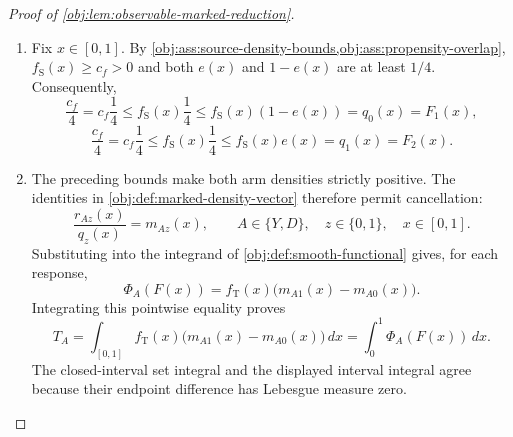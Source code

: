 \begin{proof}[Proof of \cref{obj:lem:observable-marked-reduction}]
\begin{enumerate}
For either response \(A\in\{Y,D\}\), restriction by the same indicator and the source arm-moment identity in \cref{obj:ass:arm-means-holder} give
\[
\begin{aligned}
\int_{\{X\in B\}}\mathbf 1_{\{Z=z\}}A\,dP_{\mathrm S}
&=\int_{\{X\in B,\;Z=z\}}A\,dP_{\mathrm S}\\
&=\int_B f_{\mathrm S}(x)\pi_z(x)m_{Az}(x)\,dx
=\int_B r_{Az}(x)\,dx.
\end{aligned}
\]
Applying this identity first to \(Y\) in arms \(0,1\), and then to \(D\) in arms \(0,1\), yields respectively
\[
\begin{aligned}
\int_B F_3(x)\,dx&=\int_{\{X\in B\}}(1-Z)Y\,dP_{\mathrm S},&
\int_B F_4(x)\,dx&=\int_{\{X\in B\}}ZY\,dP_{\mathrm S},\\
\int_B F_5(x)\,dx&=\int_{\{X\in B\}}(1-Z)D\,dP_{\mathrm S},&
\int_B F_6(x)\,dx&=\int_{\{X\in B\}}ZD\,dP_{\mathrm S}.
\end{aligned}
\]
These arguments apply also when \(B\) is empty.

\item Fix \(x\in[0,1]\). By
\cref{obj:ass:source-density-bounds,obj:ass:propensity-overlap},
\(f_{\mathrm S}(x)\ge c_f>0\) and both \(e(x)\) and \(1-e(x)\) are at least \(1/4\). Consequently,
\[
\frac{c_f}{4}
=c_f\frac14
\le f_{\mathrm S}(x)\frac14
\le f_{\mathrm S}(x)(1-e(x))
=q_0(x)=F_1(x),
\]
\[
\frac{c_f}{4}
=c_f\frac14
\le f_{\mathrm S}(x)\frac14
\le f_{\mathrm S}(x)e(x)
=q_1(x)=F_2(x).
\]

\item The preceding bounds make both arm densities strictly positive. The identities in \cref{obj:def:marked-density-vector} therefore permit cancellation:
\[
\frac{r_{Az}(x)}{q_z(x)}=m_{Az}(x),
\qquad A\in\{Y,D\},\quad z\in\{0,1\},\quad x\in[0,1].
\]
Substituting into the integrand of \cref{obj:def:smooth-functional} gives, for each response,
\[
\Phi_A(F(x))
=f_{\mathrm T}(x)\bigl(m_{A1}(x)-m_{A0}(x)\bigr).
\]
Integrating this pointwise equality proves
\[
T_A
=\int_{[0,1]}f_{\mathrm T}(x)
       \bigl(m_{A1}(x)-m_{A0}(x)\bigr)\,dx
=\int_0^1\Phi_A(F(x))\,dx.
\]
The closed-interval set integral and the displayed interval integral agree because their endpoint difference has Lebesgue measure zero.


\end{enumerate}
\end{proof}

